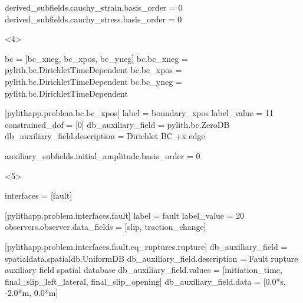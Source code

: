 \documentclass[aspectratio=169]{beamer}
\begin{document}
\begin{frame}[t,fragile]
\begin{minipage}[t]{0.67\textwidth}
\begin{onlyenv}
\begin{cfgcode}
        derived_subfields.cauchy_strain.basis_order = 0
        derived_subfields.cauchy_stress.basis_order = 0
      \end{cfgcode}
    \end{onlyenv}
    \begin{onlyenv}<4>
      \begin{cfgcode}
        bc = [bc_xneg, bc_xpos, bc_yneg]
        bc.bc_xneg = pylith.bc.DirichletTimeDependent
        bc.bc_xpos = pylith.bc.DirichletTimeDependent
        bc.bc_yneg = pylith.bc.DirichletTimeDependent
        
        [pylithapp.problem.bc.bc_xpos]
        label = boundary_xpos
        label_value = 11
        constrained_dof = [0]
        db_auxiliary_field = pylith.bc.ZeroDB
        db_auxiliary_field.description = Dirichlet BC +x edge

        auxiliary_subfields.initial_amplitude.basis_order = 0 
      \end{cfgcode}
    \end{onlyenv}
    \begin{onlyenv}<5>
      \begin{cfgcode}
        interfaces = [fault]

        [pylithapp.problem.interfaces.fault]
        label = fault
        label_value = 20
        observers.observer.data_fields = [slip, traction_change]

        [pylithapp.problem.interfaces.fault.eq_ruptures.rupture]
        db_auxiliary_field = spatialdata.spatialdb.UniformDB
        db_auxiliary_field.description = Fault rupture auxiliary field spatial database
        db_auxiliary_field.values = [initiation_time, final_slip_left_lateral, final_slip_opening]
        db_auxiliary_field.data = [0.0*s, -2.0*m, 0.0*m]
      \end{cfgcode}
    \end{onlyenv}
  \end{minipage}

  
\end{frame}
\end{document}

